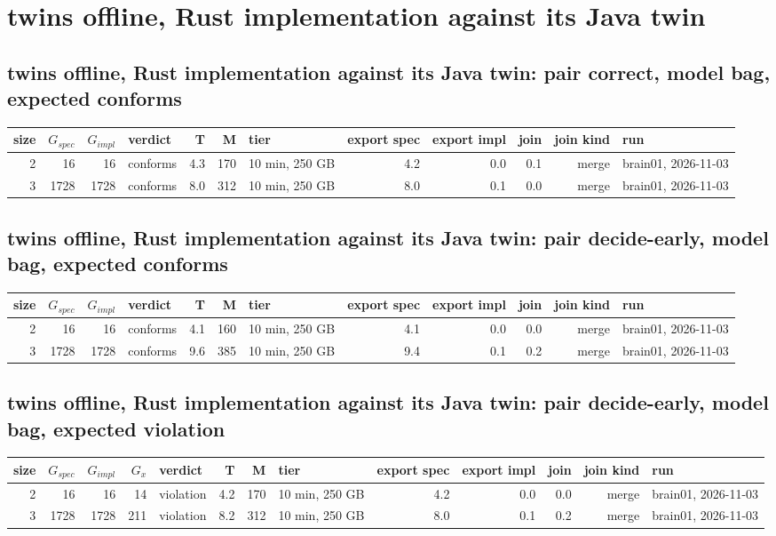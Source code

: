 \documentclass[10pt]{article}
\begin{document}
\section*{twins offline, Rust implementation against its Java twin}
\subsection*{twins offline, Rust implementation against its Java twin: pair \textsf{correct}, model bag, expected conforms}
\begin{longtable}{@{}rrrlrrlrrrrl@{}}
\toprule
size & $G_{\mathit{spec}}$ & $G_{\mathit{impl}}$ & verdict & T & M & tier & export spec & export impl & join & join kind & run \\
\midrule
\endhead
\color{blue} 2 & 16 & 16 & conforms & 4.3 & 170 & 10 min, 250 GB & 4.2 & 0.0 & 0.1 & merge & brain01, 2026-11-03 \\
\color{blue} 3 & 1728 & 1728 & conforms & 8.0 & 312 & 10 min, 250 GB & 8.0 & 0.1 & 0.0 & merge & brain01, 2026-11-03 \\
\bottomrule
\end{longtable}
\subsection*{twins offline, Rust implementation against its Java twin: pair \textsf{decide-early}, model bag, expected conforms}
\begin{longtable}{@{}rrrlrrlrrrrl@{}}
\toprule
size & $G_{\mathit{spec}}$ & $G_{\mathit{impl}}$ & verdict & T & M & tier & export spec & export impl & join & join kind & run \\
\midrule
\endhead
\color{blue} 2 & 16 & 16 & conforms & 4.1 & 160 & 10 min, 250 GB & 4.1 & 0.0 & 0.0 & merge & brain01, 2026-11-03 \\
\color{blue} 3 & 1728 & 1728 & conforms & 9.6 & 385 & 10 min, 250 GB & 9.4 & 0.1 & 0.2 & merge & brain01, 2026-11-03 \\
\bottomrule
\end{longtable}
\subsection*{twins offline, Rust implementation against its Java twin: pair \textsf{decide-early}, model bag, expected violation}
\begin{longtable}{@{}rrrrlrrlrrrrl@{}}
\toprule
size & $G_{\mathit{spec}}$ & $G_{\mathit{impl}}$ & $G_x$ & verdict & T & M & tier & export spec & export impl & join & join kind & run \\
\midrule
\endhead
\color{blue} 2 & 16 & 16 & 14 & violation & 4.2 & 170 & 10 min, 250 GB & 4.2 & 0.0 & 0.0 & merge & brain01, 2026-11-03 \\
\color{blue} 3 & 1728 & 1728 & 211 & violation & 8.2 & 312 & 10 min, 250 GB & 8.0 & 0.1 & 0.2 & merge & brain01, 2026-11-03 \\
\bottomrule
\end{longtable}
\end{document}
